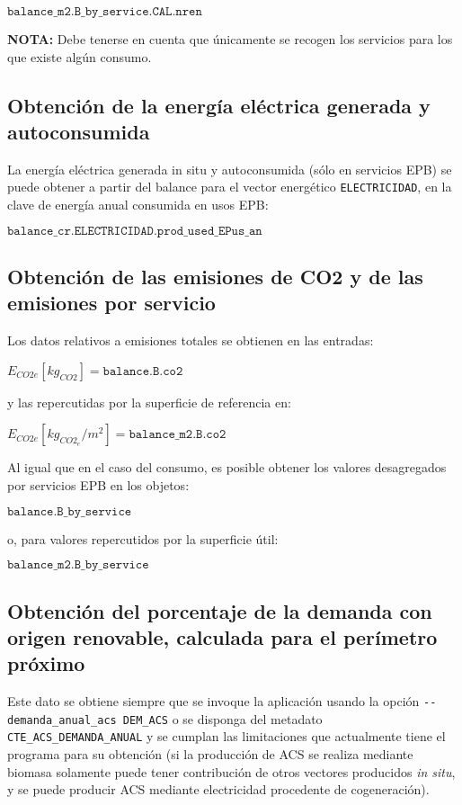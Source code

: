 \documentclass[10pt,notitlepage,oneside,a4paper]{article}
\begin{document}
$\texttt{balance\_m2.B\_by\_service.CAL.nren}$

\textbf{NOTA:} Debe tenerse en cuenta que únicamente se recogen los servicios para los que existe algún consumo.

\subsection{Obtención de la energía eléctrica generada y autoconsumida}

La energía eléctrica generada in situ y autoconsumida (sólo en servicios EPB) se puede obtener a partir del balance para el vector energético \texttt{ELECTRICIDAD}, en la clave de energía anual consumida en usos EPB:

$\texttt{balance\_cr.ELECTRICIDAD.prod\_used\_EPus\_an}$

\subsection{Obtención de las emisiones de CO2 y de las emisiones por servicio}

Los datos relativos a emisiones totales se obtienen en las entradas:

$E_{CO2e} [kg_{CO2}] = \texttt{balance.B.co2}$

y las repercutidas por la superficie de referencia en:

$E_{CO2e} [kg_{CO2_e}/m^2] = \texttt{balance\_m2.B.co2}$

Al igual que en el caso del consumo, es posible obtener los valores desagregados por servicios EPB en los objetos:

$\texttt{balance.B\_by\_service}$

o, para valores repercutidos por la superficie útil:

$\texttt{balance\_m2.B\_by\_service}$

\subsection{Obtención del porcentaje de la demanda con origen renovable, calculada para el perímetro próximo}

Este dato se obtiene siempre que se invoque la aplicación usando la opción \texttt{-{}-demanda\_anual\_acs DEM\_ACS} o se disponga del metadato \texttt{CTE\_ACS\_DEMANDA\_ANUAL} y se cumplan las limitaciones que actualmente tiene el programa para su obtención (si la producción de ACS se realiza mediante biomasa solamente puede tener contribución de otros vectores producidos \textit{in situ}, y se puede producir ACS mediante electricidad procedente de cogeneración).
\end{document}

